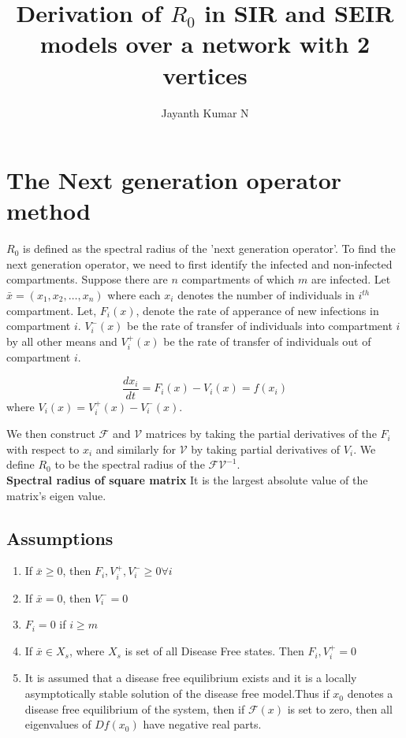 \documentclass[14pt]{article}
\begin{document}
\author{Jayanth Kumar N}
\title{\textbf{Derivation of $R_{0}$ in SIR and SEIR models over a network with 2 vertices}}
\maketitle

\section{The Next generation operator method}
$R_{0}$ is defined as the spectral radius of the 'next generation
operator'.  To find the next generation operator, we need to first
identify the infected and non-infected compartments. Suppose there are
$n$ compartments of which $m$ are infected. Let $\bar{x}=(x_{1},x_{2},\dots,x_{n})$
where each $x_{i}$ denotes the number of individuals in $i^{th}$ compartment.
Let, $F_{i}(x)$, denote the rate of apperance of new infections in compartment $i$.
$V^{-}_{i}(x)$ be the rate of transfer of individuals into compartment $i$ by all other means and
$V^{+}_{i}(x)$ be the rate of transfer of individuals out of compartment $i$.

$$\frac{dx_{i}}{dt}=F_{i}(x)-V_{i}(x)= f(x_{i})$$  where $V_{i}(x)=V^{+}_{i}(x)-V^{-}_{i}(x)$.

We then construct $\mathcal{F}$ and $\mathcal{V}$ matrices by taking
the partial derivatives of the $F_{i}$ with respect to $x_{i}$ and
similarly for $\mathcal{V}$ by taking partial derivatives of $V_{i}$.
We define $R_{0}$ to be the spectral radius of the $\mathcal{F}\mathcal{V}^{-1}$.\\
\textbf{Spectral radius of square matrix} It is the  largest absolute value of the matrix's eigen value.


\subsection{Assumptions}
\begin{enumerate}
\item If $\bar{x} \geq 0$, then $F_{i},V_{i}^{+}, V_{i}^{-} \geq 0 \forall i$
\item If $\bar{x} = 0$, then $V_{i}^{-} = 0$
\item $F_{i} = 0$ if $i \geq m$
\item If $\bar{x} \in X_{s} $, where $X_{s}$ is set of all Disease Free states. Then $F_{i},V_{i}^{+}=0$
  \item It is assumed that a disease free equilibrium exists and it is a locally asymptotically stable solution of the disease free model.Thus if $x_{0}$ denotes a disease free equilibrium of the system, then if $\mathcal{F}(x)$ is set to zero, then all eigenvalues of $Df(x_{0})$ have negative real parts.
\end{enumerate}
\end{document}
